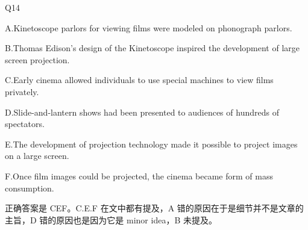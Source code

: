 \begin{blk}
    \begin{qst}
        Q14
    \end{qst}

    \begin{chc}
        A.Kinetoscope parlors for viewing films were modeled on phonograph parlors.

        B.Thomas Edison's design of the Kinetoscope inspired the development of large screen projection.

        C.Early cinema allowed individuals to use special machines to view films privately.

        D.Slide-and-lantern shows had been presented to audiences of hundreds of spectators.

        E.The development of projection technology made it possible to project images on a large screen.

        F.Once film images could be projected, the cinema became form of mass consumption.
    \end{chc}

    \begin{nlz}
        正确答案是 CEF。C.E.F 在文中都有提及，A 错的原因在于是细节并不是文章的主旨，D 错的原因也是因为它是 minor idea，B 未提及。
    \end{nlz}
\end{blk}
